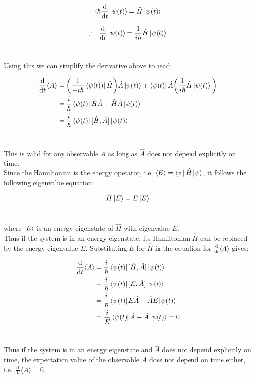 \documentclass[14pt]{extarticle}
\renewcommand{\d}{\text{d}}
\newcommand{\ddt}[1]{\frac{\d #1}{\d t}}
\begin{document}
$$i\hbar \ddt{} \ket{\psi(t)} = \hat H \ket{\psi(t)}$$

$$\therefore \;\; \ddt{} \ket{\psi(t)} = \frac{1}{i\hbar} \hat H \ket{\psi(t)}$$ \ 

Using this we can simplify the derivative above to read:

$$
\begin{aligned}
	\ddt{} \langle A \rangle &= \bigg( \frac{1}{-i\hbar} \bra{\psi(t))} \hat H \bigg) \hat A \ket{\psi(t)} + \bra{\psi(t)} \hat A \bigg( \frac{1}{i\hbar} \hat H \ket{\psi(t)} \bigg) \\ 
	&= \frac i \hbar \bra{\psi(t)} \hat H \hat A - \hat H \hat A \ket{\psi(t)} \\ 
	&= \frac i \hbar \bra{\psi(t)} [\hat H, \hat A] \ket{\psi(t)}
\end{aligned}
$$ \ 

This is valid for any observable $A$ as long as $\hat A$ does not depend explicitly on time. \\ 

Since the Hamiltonian is the energy operator, i.e. $\langle E \rangle = \bra{\psi} \hat H \ket{\psi}$, it follows the following eigenvalue equation:

$$\hat H \ket{E} = E \ket{E}$$ \ 

where $\ket{E}$ is an energy eigenstate of $\hat H$ with eigenvalue $E$. \\ 

Thus if the system is in an energy eigenstate, its Hamiltonian $\hat H$ can be replaced by the energy eigenvalue $E$. Substituting $E$ for $\hat H$ in the equation for $\ddt{} \langle A \rangle$ gives:

$$
\begin{aligned}
	\ddt{} \langle A \rangle &= \frac i \hbar \bra{\psi(t)} [\hat H, \hat A] \ket{\psi(t)} \\ 
	&= \frac i \hbar \bra{\psi(t)} [E,\hat A] \ket{\psi(t)} \\ 
	&= \frac i \hbar \bra{\psi(t)} E \hat A - \hat A E \ket{\psi(t)} \\ 
	&= \frac i E \bra{\psi(t)} \hat A -  \hat A \ket{\psi(t)}  = 0\\ 
\end{aligned}
$$ \ 

Thus if the system is in an energy eigenstate and $\hat A$ does not depend explicitly on time, the expectation value of the observable $A$ does not depend on time either, i.e. $\ddt{} \langle A \rangle =0$. \\ 
\end{document}
